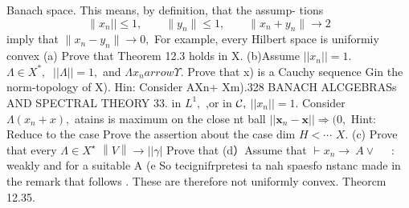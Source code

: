 Banach space. This means, by definition, that the assump- tions $$ \|x_{n}||\leq1,\qquad\|y_{n}\|\leq1,\qquad\|x_{n}+y_{n}\|\to2 $$ imply that $\|x_{n}-y_{n}\|\to0,$ For example, every Hilbert space is uniformiy convex (a) Prove that Theorem 12.3 holds in X. (b)Assume $||x_{n}||=1.$ $\Lambda\in X^{*},\;\;||\Lambda||=1,$ and $\Lambda x_{n} arrow\Upsilon.$ Prove that {x)} is a Cauchy sequence Gin the norm-topology of X). Hin: Consider AXn+ Xm).328 BANACH ALCGEBRASs AND SPECTRAL THEORY 33. in $L^{1},$ ,or in ${\cal{C}},$ $||x_{n}||=1.$ Consider $\Lambda(x_{n}+x),$ atains is maximum on the close nt ball $\left|\left|{\boldsymbol{x}}_{n}-{\boldsymbol{x}}\right|\right|\Rightarrow(0,$ Hint: Reduce to the case Prove the assertion about the case dim $H<\cdots$ $X.$ (c) Prove that every $\Lambda\in X^{\star}$ $\left\|V\right\|\to\left| |\gamma\right|$ Prove that (d）Assume that $\vdash x_{n}\to\ A\lor\quad$ : weakly and for a suitable A (e So tecignifrpretesi ta nah spaesfo nstanc made in the remark that follows . These are therefore not uniformly convex. Theorcm 12.35.